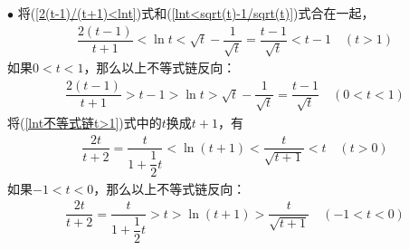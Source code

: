 \begin{enumerate}[label={【\textbf{例\thechapter.\arabic*}】},
 leftmargin=\inteval{\myenumleftmargin}pt,
 itemsep=\inteval{\myenumitempsep}pt,
 itemindent=\inteval{\myenumitemindent}pt]
$ \bullet $ 将(\ref{2(t-1)/(t+1)<lnt})式和(\ref{lnt<sqrt(t)-1/sqrt(t)})式合在一起，
\begin{align}\label{lnt不等式链t>1}
	\dfrac{2(t-1)}{t+1}<\ln t<\sqrt{t}-\dfrac{1}{\sqrt{t}}=
	\dfrac{t-1}{\sqrt{t}}<t-1 \quad (t>1)
\end{align}
如果$ 0<t<1 $，那么以上不等式链反向：
\begin{align}\label{lnt不等式链0<t<1}
	\dfrac{2(t-1)}{t+1}>t-1>\ln t>\sqrt{t}-\dfrac{1}{\sqrt{t}}=
	\dfrac{t-1}{\sqrt{t}} \quad (0<t<1)
\end{align}
将(\ref{lnt不等式链t>1})式中的$ t $换成$ t+1 $，有
\begin{align}\label{ln(1+t)不等式链t>0}
	\dfrac{2t}{t+2}=\dfrac{t}{1+\dfrac{1}{2}t}<\ln(t+1)<\dfrac{t}{\sqrt{t+1}}<t \quad (t>0)
\end{align}
如果$ -1<t<0 $，那么以上不等式链反向：
\begin{align}\label{ln(1+t)不等式链-1<t<0}
	\dfrac{2t}{t+2}=\dfrac{t}{1+\dfrac{1}{2}t}>t>\ln(t+1)>\dfrac{t}{\sqrt{t+1}} \quad (-1<t<0 )
\end{align}


\end{enumerate}
